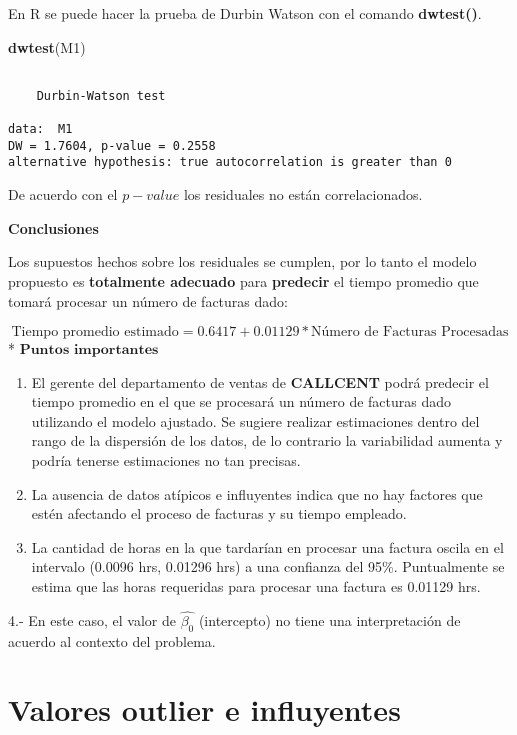 \documentclass[
  a4paper,
  oneside,
  openany]{book}
\newenvironment{Shaded}{\begin{snugshade}}{\end{snugshade}}
\newcommand{\FunctionTok}[1]{\textcolor[rgb]{0.13,0.29,0.53}{\textbf{#1}}}
\newcommand{\NormalTok}[1]{#1}
\begin{document}
En R se puede hacer la prueba de Durbin Watson con el comando \textbf{dwtest()}.

\begin{Shaded}
\begin{Highlighting}[]
\FunctionTok{dwtest}\NormalTok{(M1)}
\end{Highlighting}
\end{Shaded}

\begin{verbatim}

    Durbin-Watson test

data:  M1
DW = 1.7604, p-value = 0.2558
alternative hypothesis: true autocorrelation is greater than 0
\end{verbatim}

De acuerdo con el \(p-value\) los residuales no están correlacionados.

\textbf{Conclusiones}

Los supuestos hechos sobre los residuales se cumplen, por lo tanto el modelo propuesto es \textbf{totalmente adecuado} para \textbf{predecir} el tiempo promedio que tomará procesar un número de facturas dado:

\[\mbox{Tiempo promedio estimado}=0.6417+0.01129* \mbox{Número de Facturas Procesadas} \]
* \(\textbf{Puntos importantes}\)

\begin{enumerate}
\def\labelenumi{\arabic{enumi}.}
\item
  El gerente del departamento de ventas de \textbf{CALLCENT} podrá predecir el tiempo promedio en el que se procesará un número de facturas dado utilizando el modelo ajustado. Se sugiere realizar estimaciones dentro del rango de la dispersión de los datos, de lo contrario la variabilidad aumenta y podría tenerse estimaciones no tan precisas.
\item
  La ausencia de datos atípicos e influyentes indica que no hay factores que estén afectando el proceso de facturas y su tiempo empleado.
\item
  La cantidad de horas en la que tardarían en procesar una factura oscila en el intervalo (0.0096 hrs, 0.01296 hrs) a una confianza del 95\%. Puntualmente se estima que las horas requeridas para procesar una factura es 0.01129 hrs.
\end{enumerate}

4.- En este caso, el valor de \(\hat{\beta_{0}}\) (intercepto) no tiene una interpretación de acuerdo al contexto del problema.

\hypertarget{valores-outlier-e-influyentes}{%
\section{Valores outlier e influyentes}\label{valores-outlier-e-influyentes}}
\end{document}
